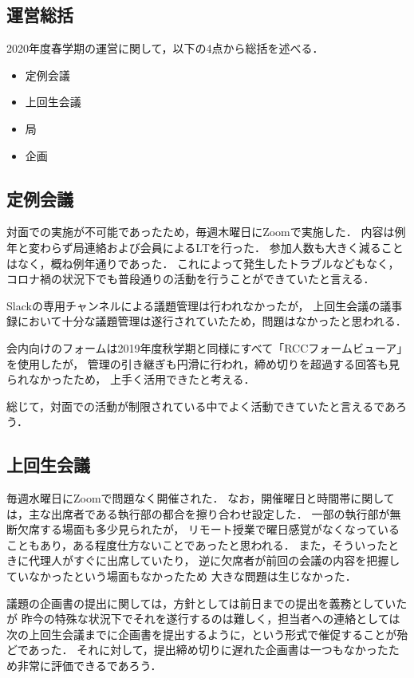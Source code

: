 \subsection*{運営総括}


2020年度春学期の運営に関して，以下の4点から総括を述べる．
\begin{itemize}
  \item 定例会議
  \item 上回生会議
  \item 局
  \item 企画
\end{itemize}

\subsection*{定例会議}
対面での実施が不可能であったため，毎週木曜日にZoomで実施した．
内容は例年と変わらず局連絡および会員によるLTを行った．
参加人数も大きく減ることはなく，概ね例年通りであった．
これによって発生したトラブルなどもなく，
コロナ禍の状況下でも普段通りの活動を行うことができていたと言える．

Slackの専用チャンネルによる議題管理は行われなかったが，
上回生会議の議事録において十分な議題管理は遂行されていたため，問題はなかったと思われる．

会内向けのフォームは2019年度秋学期と同様にすべて「RCCフォームビューア」を使用したが，
管理の引き継ぎも円滑に行われ，締め切りを超過する回答も見られなかったため，
上手く活用できたと考える．

総じて，対面での活動が制限されている中でよく活動できていたと言えるであろう．

\subsection*{上回生会議}
毎週水曜日にZoomで問題なく開催された．
なお，開催曜日と時間帯に関しては，主な出席者である執行部の都合を擦り合わせ設定した．
一部の執行部が無断欠席する場面も多少見られたが，
リモート授業で曜日感覚がなくなっていることもあり，ある程度仕方ないことであったと思われる．
また，そういったときに代理人がすぐに出席していたり，
逆に欠席者が前回の会議の内容を把握していなかったという場面もなかったため
大きな問題は生じなかった．

議題の企画書の提出に関しては，方針としては前日までの提出を義務としていたが
昨今の特殊な状況下でそれを遂行するのは難しく，担当者への連絡としては
次の上回生会議までに企画書を提出するように，という形式で催促することが殆どであった．
それに対して，提出締め切りに遅れた企画書は一つもなかったため非常に評価できるであろう．

